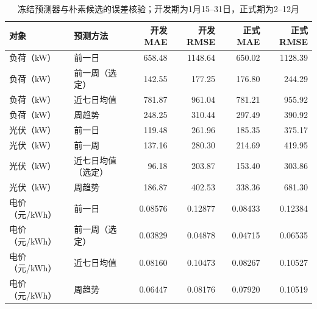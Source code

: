 \begin{table}[H]\centering\small
\caption{冻结预测器与朴素候选的误差核验；开发期为1月15--31日，正式期为2--12月}
\label{tab:revision-forecast}
\begin{tabular}{llrrrr}\toprule
对象 & 预测方法 & 开发 MAE & 开发 RMSE & 正式 MAE & 正式 RMSE\\\midrule
负荷（kW） & 前一日 & 658.48 & 1148.64 & 650.02 & 1128.39 \\
负荷（kW） & 前一周（选定） & 142.55 & 177.25 & 176.80 & 244.29 \\
负荷（kW） & 近七日均值 & 781.87 & 961.04 & 781.21 & 955.92 \\
负荷（kW） & 周趋势 & 248.25 & 310.44 & 297.49 & 390.92 \\
光伏（kW） & 前一日 & 119.48 & 261.96 & 185.35 & 375.17 \\
光伏（kW） & 前一周 & 137.16 & 280.30 & 214.69 & 419.95 \\
光伏（kW） & 近七日均值（选定） & 96.18 & 203.87 & 153.40 & 303.86 \\
光伏（kW） & 周趋势 & 186.87 & 402.53 & 338.36 & 681.30 \\
电价（元/kWh） & 前一日 & 0.08576 & 0.12877 & 0.08433 & 0.12384 \\
电价（元/kWh） & 前一周（选定） & 0.03829 & 0.04878 & 0.04715 & 0.06535 \\
电价（元/kWh） & 近七日均值 & 0.08160 & 0.10473 & 0.08267 & 0.10527 \\
电价（元/kWh） & 周趋势 & 0.06447 & 0.08176 & 0.07920 & 0.10519 \\
\bottomrule\end{tabular}\end{table}
